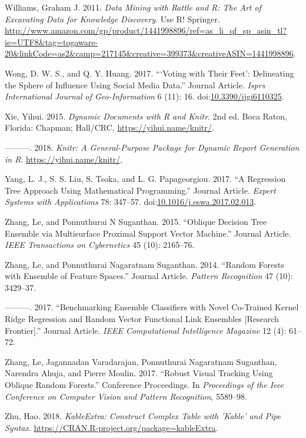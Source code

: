 \documentclass[]{elsarticle} %
\begin{document}
\hypertarget{ref-Williams2011}{}
Williams, Graham J. 2011. \emph{Data Mining with Rattle and R: The Art
of Excavating Data for Knowledge Discovery}. Use R! Springer.
\url{http://www.amazon.com/gp/product/1441998896/ref=as_li_qf_sp_asin_tl?ie=UTF8\&tag=togaware-20\&linkCode=as2\&camp=217145\&creative=399373\&creativeASIN=1441998896}.

\hypertarget{ref-Wong2017}{}
Wong, D. W. S., and Q. Y. Huang. 2017. ```Voting with Their Feet':
Delineating the Sphere of Influence Using Social Media Data.'' Journal
Article. \emph{Isprs International Journal of Geo-Information} 6 (11):
16. doi:\href{https://doi.org/10.3390/ijgi6110325}{10.3390/ijgi6110325}.

\hypertarget{ref-Xie2015}{}
Xie, Yihui. 2015. \emph{Dynamic Documents with R and Knitr}. 2nd ed.
Boca Raton, Florida: Chapman; Hall/CRC. \url{https://yihui.name/knitr/}.

\hypertarget{ref-Xie2018}{}
---------. 2018. \emph{Knitr: A General-Purpose Package for Dynamic
Report Generation in R}. \url{https://yihui.name/knitr/}.

\hypertarget{ref-Yang2017}{}
Yang, L. J., S. S. Liu, S. Tsoka, and L. G. Papageorgiou. 2017. ``A
Regression Tree Approach Using Mathematical Programming.'' Journal
Article. \emph{Expert Systems with Applications} 78: 347--57.
doi:\href{https://doi.org/10.1016/j.eswa.2017.02.013}{10.1016/j.eswa.2017.02.013}.

\hypertarget{ref-ZhangSuganthan2015}{}
Zhang, Le, and Ponnuthurai N Suganthan. 2015. ``Oblique Decision Tree
Ensemble via Multisurface Proximal Support Vector Machine.'' Journal
Article. \emph{IEEE Transactions on Cybernetics} 45 (10): 2165--76.

\hypertarget{ref-ZhangSuganthan2014}{}
Zhang, Le, and Ponnuthurai Nagaratnam Suganthan. 2014. ``Random Forests
with Ensemble of Feature Spaces.'' Journal Article. \emph{Pattern
Recognition} 47 (10): 3429--37.

\hypertarget{ref-ZhangSuganthan2017}{}
---------. 2017. ``Benchmarking Ensemble Classifiers with Novel
Co-Trained Kernel Ridge Regression and Random Vector Functional Link
Ensembles {[}Research Frontier{]}.'' Journal Article. \emph{IEEE
Computational Intelligence Magazine} 12 (4): 61--72.

\hypertarget{ref-ZhangVaradajan2017}{}
Zhang, Le, Jagannadan Varadarajan, Ponnuthurai Nagaratnam Suganthan,
Narendra Ahuja, and Pierre Moulin. 2017. ``Robust Visual Tracking Using
Oblique Random Forests.'' Conference Proceedings. In \emph{Proceedings
of the Ieee Conference on Computer Vision and Pattern Recognition},
5589--98.

\hypertarget{ref-Zhu2018}{}
Zhu, Hao. 2018. \emph{KableExtra: Construct Complex Table with 'Kable'
and Pipe Syntax}. \url{https://CRAN.R-project.org/package=kableExtra}.
\end{document}
